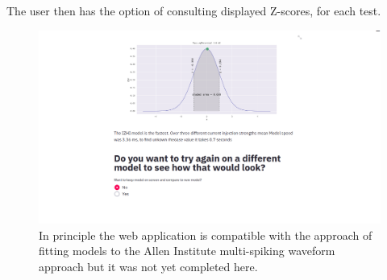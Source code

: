 The user then has the option of consulting displayed Z-scores, for each test.
\begin{figure}
\begin{center}
\includegraphics[scale=0.78]{chapters/app_tex/Screenshot from 2020-09-19 10-47-27}
\caption{In principle the web application is compatible with the approach of fitting models to the Allen Institute multi-spiking waveform approach but it was not yet completed here.}
\end{center}

\end{figure}



